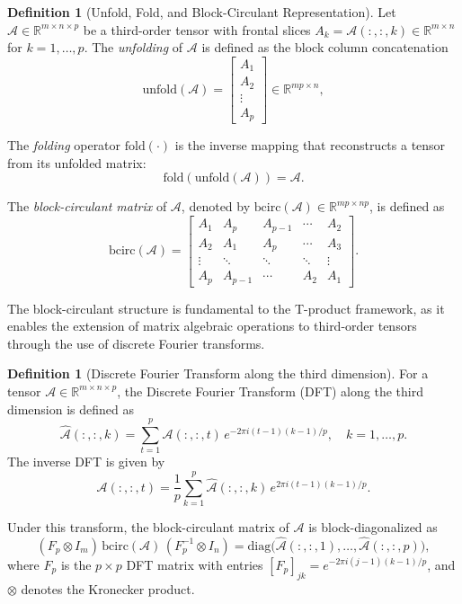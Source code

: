 \documentclass{article}
\theoremstyle{plain}
\theoremstyle{definition}
\newtheorem{definition}[theorem]{Definition}
\theoremstyle{remark}
\begin{document}
\begin{definition}[Unfold, Fold, and Block-Circulant Representation]
Let $\mathcal{A}\in\mathbb{R}^{m\times n\times p}$ be a third-order tensor with frontal slices 
$A_k=\mathcal{A}(:,:,k)\in\mathbb{R}^{m\times n}$ for $k=1,\dots,p$.
The \emph{unfolding} of $\mathcal{A}$ is defined as the block column concatenation
\[
\mathrm{unfold}(\mathcal{A}) =
\begin{bmatrix}
A_1\\
A_2\\
\vdots\\
A_p
\end{bmatrix}
\in\mathbb{R}^{mp\times n},
\]

The \emph{folding} operator $\mathrm{fold}(\cdot)$ is the inverse mapping that reconstructs
a tensor from its unfolded matrix:
\[
\mathrm{fold}(\mathrm{unfold}(\mathcal{A}))=\mathcal{A}.
\]

The \emph{block-circulant matrix} of $\mathcal{A}$, denoted by $\mathrm{bcirc}(\mathcal{A})\in\mathbb{R}^{mp\times np}$, is defined as
\[
\mathrm{bcirc}(\mathcal{A})=
\begin{bmatrix}
A_1 & A_p & A_{p-1} & \cdots & A_2\\
A_2 & A_1 & A_p & \cdots & A_3\\
\vdots & \ddots & \ddots & \ddots & \vdots\\
A_p & A_{p-1} & \cdots & A_2 & A_1
\end{bmatrix}.
\]
\end{definition}
 The block-circulant structure is fundamental to the T-product framework, as it enables the extension of matrix algebraic operations to third-order tensors through the use of discrete Fourier transforms. 


\begin{definition}[Discrete Fourier Transform along the third dimension]
\label{def:dft}
For a tensor $\mathcal{A}\in\mathbb{R}^{m\times n\times p}$, 
the Discrete Fourier Transform (DFT) along the third dimension is defined as
\[
\widehat{\mathcal{A}}(:,:,k)
= \sum_{t=1}^{p}\mathcal{A}(:,:,t)\,e^{-2\pi i (t-1)(k-1)/p}, 
\quad k=1,\dots,p.
\]
The inverse DFT is given by
\[
\mathcal{A}(:,:,t)
= \frac{1}{p}\sum_{k=1}^{p}\widehat{\mathcal{A}}(:,:,k)\,e^{2\pi i (t-1)(k-1)/p}.
\]

Under this transform, the block-circulant matrix of $\mathcal{A}$ is block-diagonalized as
\[
(F_p\otimes I_m)\,\mathrm{bcirc}(\mathcal{A})\,(F_p^{-1}\otimes I_n)
= \mathrm{diag}\big(\widehat{\mathcal{A}}(:,:,1),\dots,\widehat{\mathcal{A}}(:,:,p)\big),
\]
where $F_p$ is the $p\times p$ DFT matrix with entries $[F_p]_{jk} = e^{-2\pi i (j-1)(k-1)/p}$, and $\otimes$ denotes the Kronecker product.
\end{definition}
\end{document}
